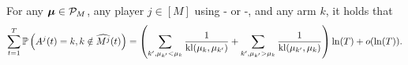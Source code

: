 \begin{lemma}\label{lem:5:elementaryLemma_RandTopM_MCTopM}
\begin{leftbar}[lemmabar]  %
  For any $\boldsymbol{\mu}\in\mathcal{P}_M$,
  any player $j \in [M]$ using
  \RandTopM- or \MCTopM-\klUCB,
  and any arm $k$,
  it holds that
  \begin{equation*}
    \sum_{t=1}^T
    \mathbb{P}\left(A^j(t)=k, k\notin \widehat{M^j}(t)\right)
    = \left(\sum_{k', \mu_{k'} < \mu_k}\frac{1}{\mathrm{kl}(\mu_k,\mu_{k'})} + \sum_{k', \mu_{k'} > \mu_k}\frac{1}{\mathrm{kl}(\mu_{k'},\mu_{k})}\right) \ln(T) + o(\ln(T)).
  \end{equation*}
\end{leftbar}  %
\end{lemma}


